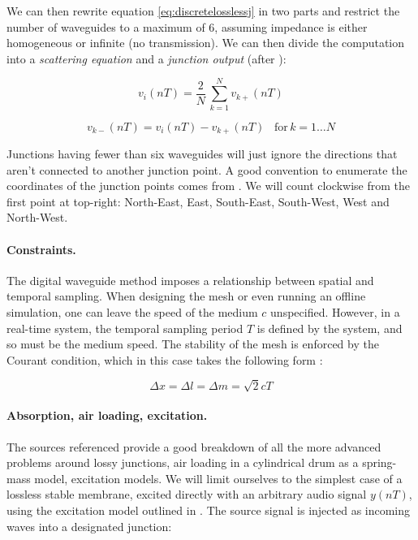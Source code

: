 \documentclass{article}
\begin{document}
We can then rewrite equation \ref{eq:discretelosslessj} in two
parts and restrict the number of waveguides to a maximum of 6,
assuming impedance is either homogeneous or infinite (no transmission).
We can then divide the computation into a \emph{scattering equation}
and a \emph{junction output} (after \cite{murphy2000digital}):

\begin{equation}
    v_{i}(nT) = \frac{2}{N}\,\sum_{k=1}^{N}v_{k+}(nT)
\end{equation}\label{eq:scatter}

\begin{equation}
    v_{k-}(nT) = v_{i}(nT) - v_{k+}(nT) \,\,\,\,\, \mbox{for}\, k = {1 \dots N}
\end{equation}\label{eq:output}

Junctions having fewer than six waveguides will just ignore
the directions that aren't connected to another junction point.
A good convention to enumerate the coordinates of the junction
points comes from \cite{murphy2000digital}. We will count clockwise
from the first point at top-right: North-East, East, South-East,
South-West, West and North-West.


\paragraph{Constraints.}
The digital waveguide method imposes a relationship between spatial
and temporal sampling. When designing the mesh or even running
an offline simulation, one can leave the speed of the medium
\(c\) unspecified. However, in a real-time system, the temporal
sampling period \(T\) is defined by the system, and so must be the
medium speed. The stability of the mesh is enforced by the
Courant condition, which in this case takes the following
form \cite{fontana1998physical}:

\begin{equation}
\Delta x = \Delta l = \Delta m = \sqrt{2}cT
\end{equation}\label{eq:courant}


\paragraph{Absorption, air loading, excitation.}
The sources referenced provide a good breakdown of all the more
advanced problems around lossy junctions, air loading in
a cylindrical drum as a spring-mass model, excitation models.
We will limit ourselves to the simplest case of a lossless
stable membrane, excited directly with an arbitrary audio signal
\(y(nT)\), using the excitation model outlined
in \cite{murphy2000digital}. The source signal is injected as incoming
waves into a designated junction:
\end{document}
